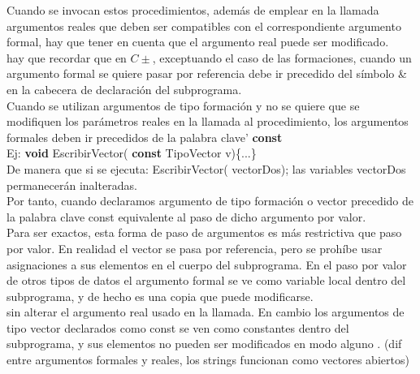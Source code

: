 \documentclass[11pt,a4paper]{article}
\begin{document}
  Cuando se invocan estos procedimientos, además de emplear en la llamada
  argumentos reales que deben ser compatibles con el correspondiente argumento
  formal, hay que tener en cuenta que el argumento real puede ser modificado.
  \\
  hay que recordar que en $C\pm$, exceptuando el caso de las
  formaciones, cuando un argumento formal se quiere pasar por referencia debe
  ir precedido del símbolo \& en la cabecera de declaración del subprograma.\\
  Cuando se utilizan argumentos de tipo formación y
  no se quiere que se modifiquen los parámetros reales en la llamada al procedimiento,
  los argumentos formales deben ir precedidos de la palabra clave'
  \textbf{const} \\
  Ej: \textbf{void} EscribirVector( \textbf{const} TipoVector v)\{...\}
  \\
  De manera que si se ejecuta: EscribirVector( vectorDos); las variables vectorDos permanecerán inalteradas.\\
  Por tanto, cuando declaramos
  argumento de tipo formación o vector precedido de la palabra clave const
  equivalente al paso de dicho argumento por valor.\\
  Para ser exactos, esta forma de paso de argumentos es más restrictiva que
  paso por valor. En realidad el vector se pasa por referencia, pero se prohíbe
  usar asignaciones a sus elementos en el cuerpo del subprograma. En el paso
  por valor de otros tipos de datos el argumento formal se ve como variable local dentro del subprograma, y de hecho es una copia que puede modificarse.\\
  sin alterar el argumento real usado en la llamada. En cambio los argumentos
  de tipo vector declarados como const se ven como constantes dentro del
  subprograma, y sus elementos no pueden ser modificados en modo alguno .
  (dif entre argumentos formales y reales, los strings funcionan como vectores abiertos)\\
\end{document}
